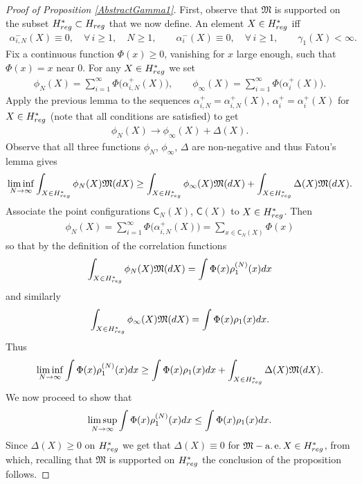 \documentclass[11pt]{article}
\numberwithin{equation}{section}
\begin{document}
\begin{proof}[Proof of Proposition \ref{AbstractGamma1}]
First, observe that $\mathfrak{M}$ is supported on the subset $H^{*}_{{\rm reg}}\subset H_{{\rm reg}}$ that we now define. An element $X \in H^*_{{\rm reg}}$ iff
\begin{gather*}
\alpha_{i,N}^-(X)\equiv 0, \quad \forall\, i\ge 1, \quad N\ge 1, \qquad \alpha_i^-(X) \equiv 0, \quad \forall\, i \ge 1, \qquad \gamma_1(X)<\infty.
\end{gather*}
Fix a continuous function $\Phi(x)\ge 0$, vanishing for $x$ large enough, such that $\Phi(x)=x$ near 0. For any $X \in H^{*}_{{\rm reg}}$ we set
\begin{gather*}
\phi_N(X) =\sum_{i=1}^{\infty}\Phi\big(\alpha_{i,N}^+(X)\big),\qquad
\phi_{\infty}(X) =\sum_{i=1}^{\infty}\Phi\big(\alpha_i^+(X)\big).
\end{gather*}
Apply the previous lemma to the sequences $\alpha_{i,N}^+=\alpha_{i,N}^+(X)$, $\alpha_{i}^+=\alpha_{i}^+(X)$ for $X \in H^{*}_{{\rm reg}}$ (note that all conditions are satisfied) to get
\begin{gather*}
\phi_N(X)\to \phi_{\infty}(X)+\Delta(X).
\end{gather*}
Observe that all three functions $\phi_N$, $\phi_{\infty}$, $\Delta$ are non-negative and thus Fatou's lemma gives
\begin{gather*}
\liminf_{N\to \infty} \int_{X \in H^{*}_{{\rm reg}}}^{}\phi_N(X)\mathfrak{M}({\rm d}X) \ge \int_{X \in H^{*}_{{\rm reg}}}^{}\phi_\infty(X)\mathfrak{M}({\rm d}X)+\int_{X \in H^{*}_{{\rm reg}}}^{}\Delta(X)\mathfrak{M}({\rm d}X).
\end{gather*}
Associate the point configurations $\mathsf{C}_N(X)$, $\mathsf{C}(X)$ to $X\in H^{*}_{{\rm reg}}$. Then
\begin{gather*}
\phi_{N}(X)=\sum_{i=1}^{\infty} \Phi\big(\alpha_{i,N}^+(X)\big)=\sum_{x \in \mathsf{C}_N(X)}^{}\Phi(x)
\end{gather*}
so that by the definition of the correlation functions
\begin{gather*}
\int_{X \in H^{*}_{{\rm reg}}}^{}\phi_N(X)\mathfrak{M}({\rm d}X)=\int\Phi(x)\rho_1^{(N)}(x){\rm d}x
\end{gather*}
and similarly
\begin{gather*}
\int_{X \in H^{*}_{{\rm reg}}}^{}\phi_\infty(X)\mathfrak{M}({\rm d}X)= \int \Phi(x)\rho_1(x){\rm d}x.
\end{gather*}
Thus
\begin{gather*}
\liminf_{N \to \infty}\int\Phi(x)\rho_1^{(N)}(x){\rm d}x \ge \int \Phi(x)\rho_1(x){\rm d}x+\int_{X \in H^{*}_{{\rm reg}}}^{}\Delta(X)\mathfrak{M}({\rm d}X).
\end{gather*}
We now proceed to show that
\begin{gather*}
\limsup_{N \to \infty}\int\Phi(x)\rho_1^{(N)}(x){\rm d}x \le \int \Phi(x)\rho_1(x){\rm d}x.
\end{gather*}
Since $\Delta(X)\ge 0$ on $H^{*}_{{\rm reg}}$ we get that $\Delta(X)\equiv 0$ for $\mathfrak{M}-\operatorname{a.e.} X \in H^*_{{\rm reg}}$, from which, recalling that $\mathfrak{M}$ is supported on $H^*_{{\rm reg}}$ the conclusion of the proposition follows.


\end{proof}
\end{document}
